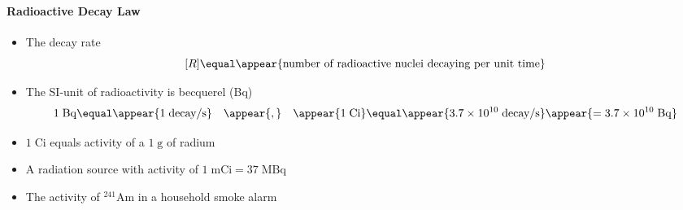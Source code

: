 \begin{frame}
\frametitle{\texorpdfstring{\culine[\sectiontitleulinecolor]{\sectiontitle}}{\sectiontitle} }
\framesubtitle{Radioactive Decay Law}

\begin{itemize}
	\item The decay rate   
\[
[ R ]  \equal  \appear{\text{number of radioactive nuclei decaying per unit time}}
\]
\vspace{-3mm}
\item The SI-unit of radioactivity is becquerel (Bq)
\[
1 \mathrm{\;Bq}  \equal \appear{1 \text {\;decay} / \mathrm{s}} \quad \appear{,} \quad 
\appear{1 \mathrm{\;Ci}}  \equal  \appear{3.7 \times 10^{10} \text {\;decay} / \mathrm{s}}\appear{=3.7 \times 10^{10} \mathrm{\;Bq}}
\]
\item $1 \mathrm{\;Ci}$ equals activity of a $1 \mathrm{\;g}$ of radium 

\item A radiation source with activity of $1 \mathrm{\;mCi}=37 \mathrm{\;MBq}$  

\item The activity of ${ }^{241} \mathrm{Am}$ in a household smoke alarm 
\end{itemize}

\endofslide 
\end{frame}

